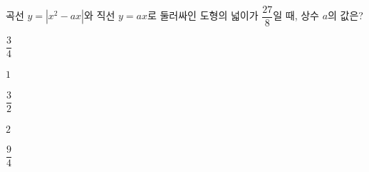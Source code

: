 곡선 $y=|x^2-ax|$와 직선 $y=ax$로 둘러싸인 도형의 넓이가 $\dfrac{27}{8}$일 때, 상수 $a$의 값은? 
\begin{choices32}{\rule[-3ex]{0pt}{8ex}$\dfrac{3}{4}$}{\rule[-3ex]{0pt}{8ex}$1$}{\rule[-3ex]{0pt}{8ex}$\dfrac{3}{2}$}{\rule[-3ex]{0pt}{8ex}$2$}{\rule[-3ex]{0pt}{8ex}$\dfrac{9}{4}$}\end{choices32}
